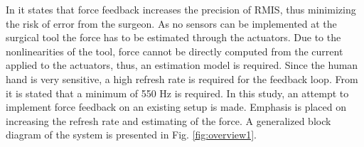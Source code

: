 




\vspace{5mm}

In \cite{} it states that force feedback increases the precision of RMIS, thus minimizing the risk of error from the surgeon.  As no sensors can be implemented at the surgical tool the force has to be estimated through the actuators. Due to the nonlinearities of the tool, force cannot be directly computed from the current applied to the actuators, thus, an estimation model is required. 
Since the human hand is very sensitive, a high refresh rate is required for the feedback loop.
From \cite{} it is stated that a minimum of 550 Hz is required. 
\vspace{5mm}
In this study, an attempt to implement force feedback on an existing setup is made. Emphasis is placed on increasing the refresh rate and estimating of the force. A generalized block diagram of the system is presented in Fig. \ref{fig:overview1}.

%

